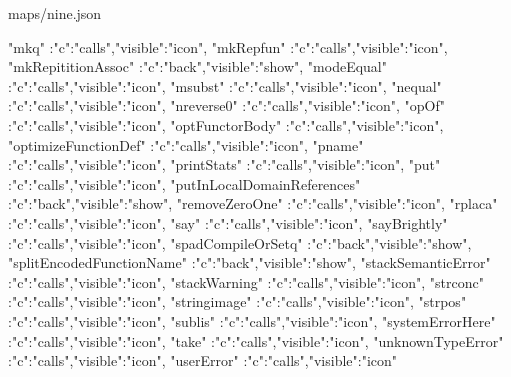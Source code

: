 \documentclass{article}
\begin{document}
\begin{chunk}{maps/nine.json}
{{  "mkq"                            :{"c":"calls","visible":"icon"},
  "mkRepfun"                       :{"c":"calls","visible":"icon"},
  "mkRepititionAssoc"              :{"c":"back","visible":"show"},
  "modeEqual"                      :{"c":"calls","visible":"icon"},
  "msubst"                         :{"c":"calls","visible":"icon"},
  "nequal"                         :{"c":"calls","visible":"icon"},
  "nreverse0"                      :{"c":"calls","visible":"icon"},
  "opOf"                           :{"c":"calls","visible":"icon"},
  "optFunctorBody"                 :{"c":"calls","visible":"icon"},
  "optimizeFunctionDef"            :{"c":"calls","visible":"icon"},
  "pname"                          :{"c":"calls","visible":"icon"},
  "printStats"                     :{"c":"calls","visible":"icon"},
  "put"                            :{"c":"calls","visible":"icon"},
  "putInLocalDomainReferences"     :{"c":"back","visible":"show"},
  "removeZeroOne"                  :{"c":"calls","visible":"icon"},
  "rplaca"                         :{"c":"calls","visible":"icon"},
  "say"                            :{"c":"calls","visible":"icon"},
  "sayBrightly"                    :{"c":"calls","visible":"icon"},
  "spadCompileOrSetq"              :{"c":"back","visible":"show"},
  "splitEncodedFunctionName"       :{"c":"back","visible":"show"},
  "stackSemanticError"             :{"c":"calls","visible":"icon"},
  "stackWarning"                   :{"c":"calls","visible":"icon"},
  "strconc"                        :{"c":"calls","visible":"icon"},
  "stringimage"                    :{"c":"calls","visible":"icon"},
  "strpos"                         :{"c":"calls","visible":"icon"},
  "sublis"                         :{"c":"calls","visible":"icon"},
  "systemErrorHere"                :{"c":"calls","visible":"icon"},
  "take"                           :{"c":"calls","visible":"icon"},
  "unknownTypeError"               :{"c":"calls","visible":"icon"},
  "userError"                      :{"c":"calls","visible":"icon"}

}}
\end{chunk}
\end{document}

